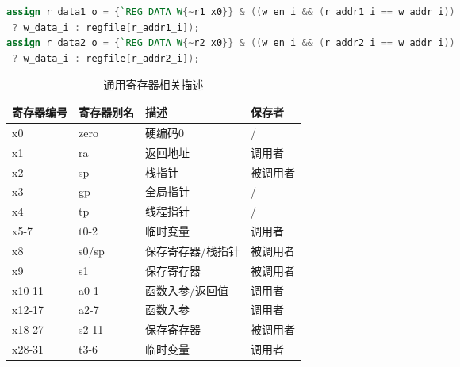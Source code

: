 \documentclass[lang=cn,11pt,a4paper,chinesefont=founder]{elegantpaper}
\begin{document}
\begin{lstlisting}[language=verilog]
assign r_data1_o = {`REG_DATA_W{~r1_x0}} & ((w_en_i && (r_addr1_i == w_addr_i))
 ? w_data_i : regfile[r_addr1_i]);
assign r_data2_o = {`REG_DATA_W{~r2_x0}} & ((w_en_i && (r_addr2_i == w_addr_i))
 ? w_data_i : regfile[r_addr2_i]);

\end{lstlisting}
\begin{table}
    \centering
\begin{tabular}{llll}
    \toprule
    寄存器编号 & 寄存器别名 & 描述              & 保存者   \\
    \midrule
    x0         & zero       & 硬编码0           & /        \\
    x1         & ra         & 返回地址          & 调用者   \\
    x2         & sp         & 栈指针            & 被调用者 \\
    x3         & gp         & 全局指针          & /        \\
    x4         & tp         & 线程指针          & /        \\
    x5-7       & t0-2       & 临时变量          & 调用者   \\
    x8         & s0/sp      & 保存寄存器/栈指针 & 被调用者 \\
    x9         & s1         & 保存寄存器        & 被调用者 \\
    x10-11     & a0-1       & 函数入参/返回值   & 调用者   \\
    x12-17     & a2-7       & 函数入参          & 调用者   \\
    x18-27     & s2-11      & 保存寄存器        & 被调用者 \\
    x28-31     & t3-6       & 临时变量          & 调用者   \\
    \bottomrule
\end{tabular}
\caption{通用寄存器相关描述}
\end{table}
\end{document}
